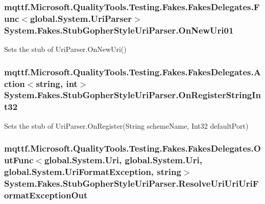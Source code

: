 \hypertarget{class_system_1_1_fakes_1_1_stub_gopher_style_uri_parser_a9dccedeaf7d07de34ec7d37789ce337c}{
\subsubsection[{On\-New\-Uri01}]{\setlength{\rightskip}{0pt plus 5cm}mqttf.\-Microsoft.\-Quality\-Tools.\-Testing.\-Fakes.\-Fakes\-Delegates.\-Func$<$global.\-System.\-Uri\-Parser$>$ System.\-Fakes.\-Stub\-Gopher\-Style\-Uri\-Parser.\-On\-New\-Uri01}}\label{class_system_1_1_fakes_1_1_stub_gopher_style_uri_parser_a9dccedeaf7d07de34ec7d37789ce337c}


Sets the stub of Uri\-Parser.\-On\-New\-Uri()

\hypertarget{class_system_1_1_fakes_1_1_stub_gopher_style_uri_parser_a1496b1dcbba2c6dbe96f59b134a7cbd8}{
\subsubsection[{On\-Register\-String\-Int32}]{\setlength{\rightskip}{0pt plus 5cm}mqttf.\-Microsoft.\-Quality\-Tools.\-Testing.\-Fakes.\-Fakes\-Delegates.\-Action$<$string, int$>$ System.\-Fakes.\-Stub\-Gopher\-Style\-Uri\-Parser.\-On\-Register\-String\-Int32}}\label{class_system_1_1_fakes_1_1_stub_gopher_style_uri_parser_a1496b1dcbba2c6dbe96f59b134a7cbd8}


Sets the stub of Uri\-Parser.\-On\-Register(\-String scheme\-Name, Int32 default\-Port)

\hypertarget{class_system_1_1_fakes_1_1_stub_gopher_style_uri_parser_adb5f26f23de77e9eb07ba79f2cd93fbe}{
\subsubsection[{Resolve\-Uri\-Uri\-Uri\-Format\-Exception\-Out}]{\setlength{\rightskip}{0pt plus 5cm}mqttf.\-Microsoft.\-Quality\-Tools.\-Testing.\-Fakes.\-Fakes\-Delegates.\-Out\-Func$<$global.\-System.\-Uri, global.\-System.\-Uri, global.\-System.\-Uri\-Format\-Exception, string$>$ System.\-Fakes.\-Stub\-Gopher\-Style\-Uri\-Parser.\-Resolve\-Uri\-Uri\-Uri\-Format\-Exception\-Out}}\label{class_system_1_1_fakes_1_1_stub_gopher_style_uri_parser_adb5f26f23de77e9eb07ba79f2cd93fbe}


